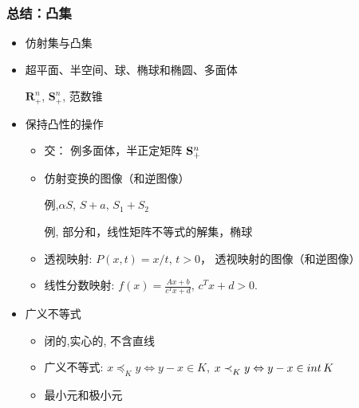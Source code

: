 \documentclass[handout]{beamer}
\begin{document}
\begin{frame}
  \frametitle{总结：凸集 }

  \begin{itemize}
    \item<only@2>   仿射集与凸集
    \item<only@2> 
   超平面、半空间、球、椭球和椭圆、多面体

        $\mathbf{R}_{+}^n$, $\mathbf{S}_{+}^n$, 范数锥



\item<only@2> 保持凸性的操作
     \begin{itemize}
       \item 交：       例\doublestar 多面体，半正定矩阵 $\mathbf{S}_{+}^{n}$

       \item 仿射变换的图像（和逆图像）

          例,\doublestar $\alpha S$, $S+a$, $S_1 + S_2$

          例, 部分和，线性矩阵不等式的解集，椭球

       \item 透视映射: $P(x,t) = x/t$, $t>0$，
      透视映射的图像（和逆图像）

       \item 线性分数映射: 
         $ f(x) = \frac{Ax+b}{c^Tx+d}$, $c^Tx+d >0$.



     \end{itemize}

     \item<only@3> 广义不等式
     \begin{itemize}
       \item {} 闭的,实心的, 不含直线

   \item 广义不等式:  
        $x\preceq_{K}^{} y \Leftrightarrow y-x \in K$, \quad 
        $x\prec_{K}^{} y \Leftrightarrow y-x\in\mathnormal{int}\,K$

      \item 最小元和极小元

     \end{itemize}
 
\end{itemize}
\end{frame}
\end{document}

